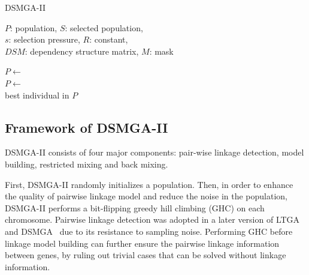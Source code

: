 \documentclass{sig-alternate-05-2015}
\begin{document}
\begin{algorithm}
\caption{DSMGA-II}\label{algo_disjdecomp}


$P$: population, $S$: selected population, \\
$s$: selection pressure, $R$: constant, \\
$DSM$: dependency structure matrix, $M$: mask \\


\BlankLine

$P \leftarrow$  \\
$P \leftarrow$  \\
\Return best individual in $P$
\end{algorithm}


\subsection{Framework of DSMGA-II}
DSMGA-II consists of four major components: pair-wise linkage detection, model building, restricted mixing and back mixing. 

First, DSMGA-II randomly initializes a population. Then, in order to enhance the quality of pairwise linkage model and reduce the noise in the population, DSMGA-II performs a bit-flipping greedy hill climbing (GHC) on each chromosome. 
Pairwise linkage detection was adopted in a later version of LTGA~\cite{pelikan:pairwise} and DSMGA~\cite{yu:DSMGA} due to its resistance to sampling noise. Performing GHC before linkage model building can further ensure the pairwise linkage information between genes, by ruling out trivial cases that can be solved without linkage information. 
\end{document}
